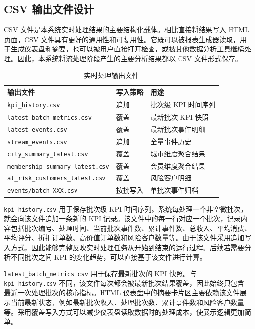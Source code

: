 \documentclass[12pt,hyperref,a4paper,UTF8]{ctexart}
\begin{document}
\subsection{CSV 输出文件设计}

CSV 文件是本系统实时处理结果的主要结构化载体。相比直接将结果写入 HTML 页面，CSV 文件具有更好的通用性和可复用性。它既可以被报表生成器读取，用于生成仪表盘和摘要，也可以被用户直接打开检查，或被其他数据分析工具继续处理。因此，本系统将流处理阶段产生的主要分析结果都以 CSV 文件形式保存。

\begin{table}[H]
\centering
\caption{实时处理输出文件}
\begin{tabular}{lll}
\toprule
输出文件 & 写入策略 & 用途 \\
\midrule
\texttt{kpi\_history.csv} & 追加 & 批次级 KPI 时间序列 \\
\texttt{latest\_batch\_metrics.csv} & 覆盖 & 最新批次 KPI 快照 \\
\texttt{latest\_events.csv} & 覆盖 & 最新批次事件明细 \\
\texttt{stream\_events.csv} & 追加 & 全量事件历史 \\
\texttt{city\_summary\_latest.csv} & 覆盖 & 城市维度聚合结果 \\
\texttt{membership\_summary\_latest.csv} & 覆盖 & 会员维度聚合结果 \\
\texttt{at\_risk\_customers\_latest.csv} & 覆盖 & 风险客户明细 \\
\texttt{events/batch\_XXX.csv} & 按批写入 & 单批次事件归档 \\
\bottomrule
\end{tabular}
\end{table}

\texttt{kpi\_history.csv} 用于保存批次级 KPI 时间序列。系统每处理一个非空微批次，就会向该文件追加一条新的 KPI 记录。该文件中的每一行对应一个批次，记录内容包括批次编号、处理时间、当前批次事件数、累计事件数、总收入、平均消费、平均评分、折扣订单数、高价值订单数和风险客户数量等。由于该文件采用追加写入方式，因此能够完整反映实时处理任务从开始到结束的运行过程。后续若需要分析不同批次之间 KPI 的变化趋势，可以直接基于该文件进行计算。

\texttt{latest\_batch\_metrics.csv} 用于保存最新批次的 KPI 快照。与 \texttt{kpi\_history.csv} 不同，该文件每次都会被最新批次结果覆盖，因此始终只包含最近一次处理批次的核心指标。HTML 仪表盘中的摘要卡片区主要依赖该文件展示当前最新状态，例如最新批次收入、处理批次数、累计事件数和风险客户数量等。采用覆盖写入方式可以减少仪表盘读取数据时的处理成本，使展示逻辑更加简单。
\end{document}
